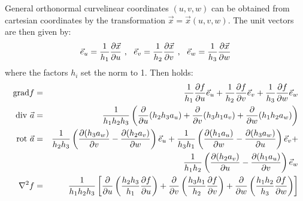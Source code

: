 General orthonormal curvelinear coordinates $(u,v,w)$ can be obtained from
cartesian coordinates by the transformation $\vec{x}=\vec{x}(u,v,w)$. The
unit vectors are then given by:
\[
\vec{e}_{u}=\frac{1}{h_1}\frac{\partial \vec{x}}{\partial u}~,~~\vec{e}_{v}=\frac{1}{h_2}\frac{\partial \vec{x}}{\partial v}~,~~
\vec{e}_{w}=\frac{1}{h_3}\frac{\partial \vec{x}}{\partial w}
\]
where the factors $h_i$ set the norm to 1. Then holds:
\begin{eqnarray*}
{\rm grad}f   &=&\frac{1}{h_1}\frac{\partial f}{\partial u}\vec{e}_{u}+\frac{1}{h_2}\frac{\partial f}{\partial v}\vec{e}_{v}+\frac{1}{h_3}\frac{\partial f}{\partial w}\vec{e}_{w}\\
{\rm div}~\vec{a}&=&\frac{1}{h_1h_2h_3}\left(\frac{\partial }{\partial u}(h_2h_3a_u)+\frac{\partial }{\partial v}(h_3h_1a_v)+\frac{\partial }{\partial w}(h_1h_2a_w)\right)\\
{\rm rot}~\vec{a}&=&\frac{1}{h_2h_3}\left(\frac{\partial (h_3a_w)}{\partial v}-\frac{\partial (h_2a_v)}{\partial w}\right)\vec{e}_{u}+
                 \frac{1}{h_3h_1}\left(\frac{\partial (h_1a_u)}{\partial w}-\frac{\partial (h_3a_w)}{\partial u}\right)\vec{e}_{v}+\\
               &&\frac{1}{h_1h_2}\left(\frac{\partial (h_2a_v)}{\partial u}-\frac{\partial (h_1a_u)}{\partial v}\right)\vec{e}_{w}\\
\nabla^2 f    &=&\frac{1}{h_1h_2h_3}\left[\frac{\partial }{\partial u}\left(\frac{h_2h_3}{h_1}\frac{\partial f}{\partial u}\right)+
                 \frac{\partial }{\partial v}\left(\frac{h_3h_1}{h_2}\frac{\partial f}{\partial v}\right)+
                 \frac{\partial }{\partial w}\left(\frac{h_1h_2}{h_3}\frac{\partial f}{\partial w}\right)\right]
\end{eqnarray*}

\newpage
{}

